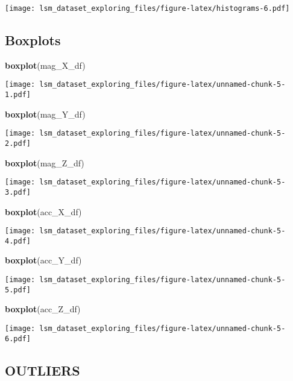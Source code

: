 \documentclass[]{article}
\newenvironment{Shaded}{\begin{snugshade}}{\end{snugshade}}
\newcommand{\KeywordTok}[1]{\textcolor[rgb]{0.13,0.29,0.53}{\textbf{#1}}}
\newcommand{\NormalTok}[1]{#1}
\begin{document}
\texttt{[image: lsm\_dataset\_exploring\_files/figure-latex/histograms-6.pdf]}

\hypertarget{boxplots}{%
\subsection{Boxplots}\label{boxplots}}

\begin{Shaded}
\begin{Highlighting}[]
\KeywordTok{boxplot}\NormalTok{(mag_X_df)}
\end{Highlighting}
\end{Shaded}

\texttt{[image: lsm\_dataset\_exploring\_files/figure-latex/unnamed-chunk-5-1.pdf]}

\begin{Shaded}
\begin{Highlighting}[]
\KeywordTok{boxplot}\NormalTok{(mag_Y_df)}
\end{Highlighting}
\end{Shaded}

\texttt{[image: lsm\_dataset\_exploring\_files/figure-latex/unnamed-chunk-5-2.pdf]}

\begin{Shaded}
\begin{Highlighting}[]
\KeywordTok{boxplot}\NormalTok{(mag_Z_df)}
\end{Highlighting}
\end{Shaded}

\texttt{[image: lsm\_dataset\_exploring\_files/figure-latex/unnamed-chunk-5-3.pdf]}

\begin{Shaded}
\begin{Highlighting}[]
\KeywordTok{boxplot}\NormalTok{(acc_X_df)}
\end{Highlighting}
\end{Shaded}

\texttt{[image: lsm\_dataset\_exploring\_files/figure-latex/unnamed-chunk-5-4.pdf]}

\begin{Shaded}
\begin{Highlighting}[]
\KeywordTok{boxplot}\NormalTok{(acc_Y_df)}
\end{Highlighting}
\end{Shaded}

\texttt{[image: lsm\_dataset\_exploring\_files/figure-latex/unnamed-chunk-5-5.pdf]}

\begin{Shaded}
\begin{Highlighting}[]
\KeywordTok{boxplot}\NormalTok{(acc_Z_df)}
\end{Highlighting}
\end{Shaded}

\texttt{[image: lsm\_dataset\_exploring\_files/figure-latex/unnamed-chunk-5-6.pdf]}

\hypertarget{outliers}{%
\subsection{OUTLIERS}\label{outliers}}
\end{document}
